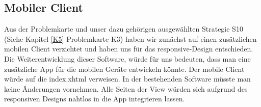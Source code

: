 \subsection{Mobiler Client}
Aus der Problemkarte und unser dazu gehörigen ausgewählten Strategie S10 (Siehe Kapitel \ref{K5} Problemkarte K3) haben wir zunächst auf einen zusätzlichen mobilen Client verzichtet und haben uns für das responsive-Design entschieden.  Die Weiterentwicklung dieser Software, würde für uns bedeuten, dass man eine zusätzliche App für die mobilen Geräte entwickeln könnte. Der mobile Client würde auf die index.xhtml verweisen. In der bestehenden Software müsste man keine Änderungen vornehmen. Alle Seiten der View würden sich aufgrund des responsiven Designs nahtlos in die App integrieren lassen.



